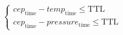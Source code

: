 \documentclass[12pt,a4paper]{article}
\author{Alexandre Rio}
\begin{document}
\[
\begin{cases}
cep_{\text{time}} - temp_{\text{time}} \leq \text{TTL} \\
cep_{\text{time}} - pressure_{\text{time}} \leq \text{TTL}
\end{cases}
\]
\end{document}
